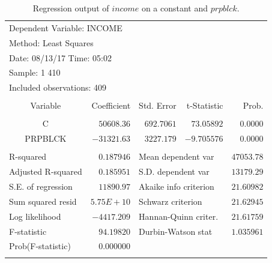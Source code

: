 \documentclass[12pt]{report}
\begin{document}
\begin{table}[H]
	\centering
	\begin{tabular}{lrrrr}
		\multicolumn{3}{l}{Dependent Variable: INCOME}&\multicolumn{1}{c}{}&\multicolumn{1}{c}{}\\
		\multicolumn{3}{l}{Method: Least Squares}&\multicolumn{1}{c}{}&\multicolumn{1}{c}{}\\
		\multicolumn{3}{l}{Date: 08/13/17   Time: 05:02}&\multicolumn{1}{c}{}&\multicolumn{1}{c}{}\\
		\multicolumn{2}{l}{Sample: 1 410}&\multicolumn{1}{c}{}&\multicolumn{1}{c}{}&\multicolumn{1}{c}{}\\
		\multicolumn{3}{l}{Included observations: 409}&\multicolumn{1}{c}{}&\multicolumn{1}{c}{}\\
		[4.5pt] \hline \\ [-4.5pt]
		\multicolumn{1}{c}{Variable}&\multicolumn{1}{r}{Coefficient}&\multicolumn{1}{r}{Std. Error}&\multicolumn{1}{r}{t-Statistic}&\multicolumn{1}{r}{Prob.}\\
		[4.5pt] \hline \\ [-4.5pt]
		\multicolumn{1}{c}{C}&\multicolumn{1}{r}{$50608.36$}&\multicolumn{1}{r}{$692.7061$}&\multicolumn{1}{r}{$73.05892$}&\multicolumn{1}{r}{$0.0000$}\\
		\multicolumn{1}{c}{PRPBLCK}&\multicolumn{1}{r}{$-31321.63$}&\multicolumn{1}{r}{$3227.179$}&\multicolumn{1}{r}{$-9.705576$}&\multicolumn{1}{r}{$0.0000$}\\
		[4.5pt] \hline \\ [-4.5pt]
		\multicolumn{1}{l}{R-squared}&\multicolumn{1}{r}{$0.187946$}&\multicolumn{2}{l}{Mean dependent var}&\multicolumn{1}{r}{$47053.78$}\\
		\multicolumn{1}{l}{Adjusted R-squared}&\multicolumn{1}{r}{$0.185951$}&\multicolumn{2}{l}{S.D. dependent var}&\multicolumn{1}{r}{$13179.29$}\\
		\multicolumn{1}{l}{S.E. of regression}&\multicolumn{1}{r}{$11890.97$}&\multicolumn{2}{l}{Akaike info criterion}&\multicolumn{1}{r}{$21.60982$}\\
		\multicolumn{1}{l}{Sum squared resid}&\multicolumn{1}{r}{$5.75E+10$}&\multicolumn{2}{l}{Schwarz criterion}&\multicolumn{1}{r}{$21.62945$}\\
		\multicolumn{1}{l}{Log likelihood}&\multicolumn{1}{r}{$-4417.209$}&\multicolumn{2}{l}{Hannan-Quinn criter.}&\multicolumn{1}{r}{$21.61759$}\\
		\multicolumn{1}{l}{F-statistic}&\multicolumn{1}{r}{$94.19820$}&\multicolumn{2}{l}{Durbin-Watson stat}&\multicolumn{1}{r}{$1.035961$}\\
		\multicolumn{1}{l}{Prob(F-statistic)}&\multicolumn{1}{r}{$0.000000$}&\multicolumn{1}{c}{}&\multicolumn{1}{c}{}&\multicolumn{1}{c}{}\\
		[4.5pt] \hline \\ [-4.5pt]
	\end{tabular}
	\caption{Regression output of $income$ on a constant and $prpblck$.}
\end{table}
\end{document}
